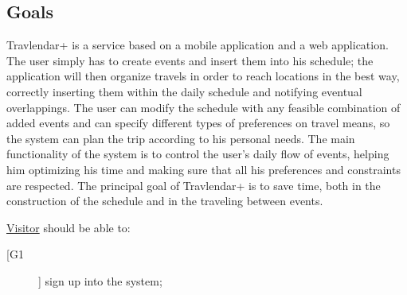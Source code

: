 \subsection{Goals}
Travlendar+ is a service based on a mobile application and a web application.
\newline
\newline
The user simply has to create events and insert them into his schedule; the application will then organize travels in order to reach locations in the best way, correctly inserting them within the daily schedule and notifying eventual overlappings. \newline
The user can modify the schedule with any feasible combination of added events and can specify different types of preferences on travel means, so the system can plan the trip according to his personal needs.
\newline
\newline
The main functionality of the system is to control the user's daily flow of events, helping him optimizing his time and making sure that all his preferences and constraints are respected.
The principal goal of Travlendar+ is to save time, both in the construction of the schedule and in the traveling between events.
\newline
\newline

\underline{Visitor} should be able to:
\begin{description}
\item [[G1]] sign up into the system;
\end{description}

